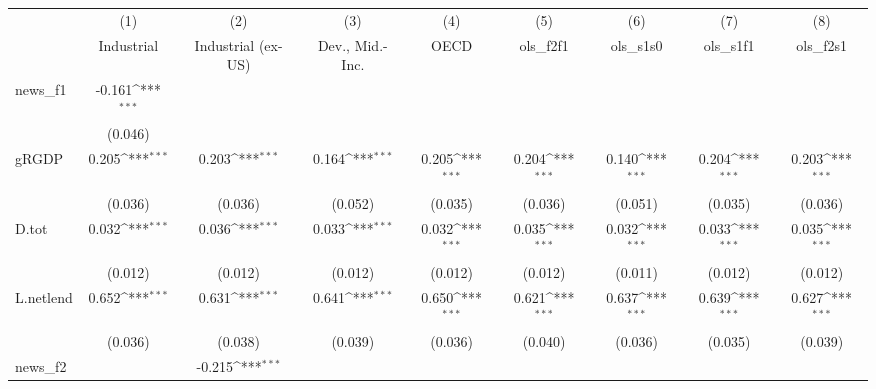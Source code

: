 {
\def\sym#1{\ifmmode^{#1}\else\(^{#1}\)\fi}
\begin{tabular}{l*{8}{c}}
\toprule
            &\multicolumn{1}{c}{(1)}&\multicolumn{1}{c}{(2)}&\multicolumn{1}{c}{(3)}&\multicolumn{1}{c}{(4)}&\multicolumn{1}{c}{(5)}&\multicolumn{1}{c}{(6)}&\multicolumn{1}{c}{(7)}&\multicolumn{1}{c}{(8)}\\
            &\multicolumn{1}{c}{Industrial}&\multicolumn{1}{c}{Industrial (ex-US)}&\multicolumn{1}{c}{Dev., Mid.-Inc.}&\multicolumn{1}{c}{OECD}&\multicolumn{1}{c}{ols\_f2f1}&\multicolumn{1}{c}{ols\_s1s0}&\multicolumn{1}{c}{ols\_s1f1}&\multicolumn{1}{c}{ols\_f2s1}\\
\midrule
news\_f1     &      -0.161\sym{***}&                     &                     &                     &                     &                     &                     &                     \\
            &     (0.046)         &                     &                     &                     &                     &                     &                     &                     \\
\addlinespace
gRGDP       &       0.205\sym{***}&       0.203\sym{***}&       0.164\sym{***}&       0.205\sym{***}&       0.204\sym{***}&       0.140\sym{***}&       0.204\sym{***}&       0.203\sym{***}\\
            &     (0.036)         &     (0.036)         &     (0.052)         &     (0.035)         &     (0.036)         &     (0.051)         &     (0.035)         &     (0.036)         \\
\addlinespace
D.tot       &       0.032\sym{***}&       0.036\sym{***}&       0.033\sym{***}&       0.032\sym{***}&       0.035\sym{***}&       0.032\sym{***}&       0.033\sym{***}&       0.035\sym{***}\\
            &     (0.012)         &     (0.012)         &     (0.012)         &     (0.012)         &     (0.012)         &     (0.011)         &     (0.012)         &     (0.012)         \\
\addlinespace
L.netlend   &       0.652\sym{***}&       0.631\sym{***}&       0.641\sym{***}&       0.650\sym{***}&       0.621\sym{***}&       0.637\sym{***}&       0.639\sym{***}&       0.627\sym{***}\\
            &     (0.036)         &     (0.038)         &     (0.039)         &     (0.036)         &     (0.040)         &     (0.036)         &     (0.035)         &     (0.039)         \\
\addlinespace
news\_f2     &                     &      -0.215\sym{***}&                     &                     &                     &                     &                     &                     \\

\end{tabular}}
